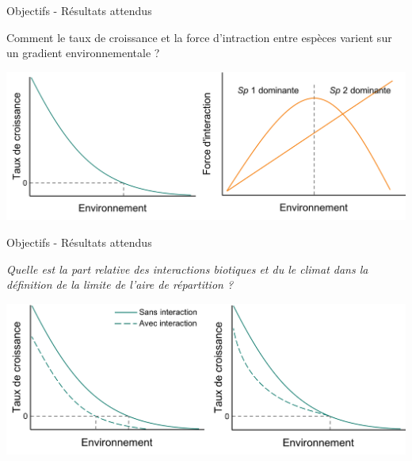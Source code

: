 \documentclass[11pt, compress, aspectratio=1610]{beamer}
\begin{document}
\begin{frame}{Objectifs - Résultats attendus}
\protect\hypertarget{objectifs---ruxe9sultats-attendus}{}

\centering

Comment le taux de croissance et la force d’intraction entre espèces
varient sur un gradient environnementale ?

\vspace*{10mm}

\centering \includegraphics[scale=0.45]{figures/output_chap2a.png}

\par

\end{frame}

\begin{frame}{Objectifs - Résultats attendus}
\protect\hypertarget{objectifs---ruxe9sultats-attendus-1}{}

\centering

\emph{Quelle est la part relative des interactions biotiques et du le
climat dans la définition de la limite de l’aire de répartition ?}

\vspace*{10mm}
\centering

\includegraphics[scale=0.45]{figures/output_chap2b.png}

\par

\end{frame}
\end{document}
